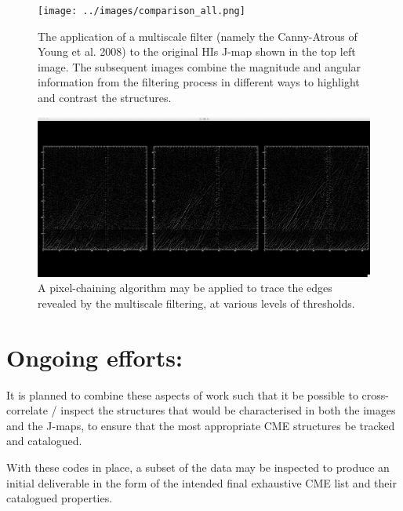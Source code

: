 \documentclass[12pt, a4paper, oneside]{article}
\begin{document}
\begin{figure}[]
\centering
\texttt{[image: ../images/comparison\_all.png]}
\caption{The application of a multiscale filter (namely the Canny-Atrous of Young et al. 2008) to the original HIs J-map shown in the top left image. The subsequent images combine the magnitude and angular information from the filtering process in different ways to highlight and contrast the structures.}
\label{comparison_all}
\end{figure}

\begin{figure}[]
\centering
\includegraphics[width=\textwidth]{../images/edges_thr.png}
\caption{A pixel-chaining algorithm may be applied to trace the edges revealed by the multiscale filtering, at various levels of thresholds.}
\label{edges_thr}
\end{figure}


\section{Ongoing efforts:}

It is planned to combine these aspects of work such that it be possible to cross-correlate / inspect the structures that would be characterised in both the images and the J-maps, to ensure that the most appropriate CME structures be tracked and catalogued.

With these codes in place, a subset of the data may be inspected to produce an initial deliverable in the form of the intended final exhaustive CME list and their catalogued properties.


\end{document}
